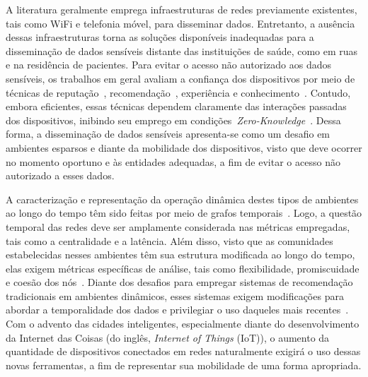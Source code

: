 \documentclass[12pt]{article}
\newcommand{\as}[1]{\textcolor{blue}{{\bf #1}}}
\newcommand{\al}[1]{\textcolor{brown}{{\bf #1}}}
\begin{document}

A literatura geralmente emprega infraestruturas de redes previamente existentes, tais como WiFi e telefonia móvel, para disseminar dados.
Entretanto, a ausência dessas infraestruturas torna as soluções disponíveis inadequadas para a disseminação de dados sensíveis
distante das
instituições de saúde, como em ruas e na residência de pacientes. Para evitar o acesso não autorizado aos dados sensíveis, os trabalhos
em geral avaliam a confiança dos dispositivos por meio de técnicas de reputação~\cite{truong2017toward}, recomendação~\cite{al2017trust}, experiência e conhecimento~\cite{truong2017toward}. Contudo,
embora eficientes,
essas técnicas dependem
claramente
das interações passadas dos dispositivos, inibindo seu emprego em condições~\textit{Zero-Knowledge}~\cite{kim2015hcs}.
Dessa forma, a disseminação de dados sensíveis apresenta-se como um desafio em ambientes esparsos e diante da mobilidade dos dispositivos, visto que deve ocorrer no momento oportuno e às entidades adequadas, a fim de evitar o acesso não autorizado a esses dados.

A caracterização e representação
da operação dinâmica
destes
tipos de
ambientes ao longo do tempo têm sido 
feitas
por meio de grafos temporais~\cite{nzeko2017time}. 
Logo,
a questão temporal
das redes
deve ser amplamente considerada nas métricas empregadas, tais como a centralidade e a latência. Além disso, visto que as comunidades estabelecidas nesses ambientes têm sua estrutura modificada ao longo do tempo, elas exigem métricas específicas 
de %
análise, tais como flexibilidade, promiscuidade e coesão dos nós~\cite{sizemore2018dynamic}. Diante dos desafios para empregar sistemas de recomendação tradicionais em ambientes dinâmicos, esses sistemas 
exigem modificações para abordar a temporalidade dos dados
e privilegiar
o uso daqueles mais recentes~\cite{nzeko2017time}. Com o advento das cidades inteligentes, especialmente diante do desenvolvimento da Internet das Coisas (do inglês, \textit{Internet of Things} (IoT)), o aumento da quantidade de dispositivos conectados em redes naturalmente exigirá o uso dessas novas ferramentas, a fim de representar sua mobilidade de uma forma apropriada.
\end{document}
